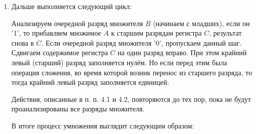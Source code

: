 \documentclass[12pt,a4paper]{scrartcl}
\begin{document}
\begin{enumerate}
	\item Дальше выполняется следующий цикл:
	
	\subitem Анализируем очередной разряд множителя $B$ (начинаем с младших), если он '1', то прибавляем множимое $A$ к старшим разрядам регистра $C$, результат снова в $C$. Если очередной разряд множителя '0', пропускаем данный шаг.
	\subitem Сдвигаем содержимое регистра $C$ на один разряд вправо. При этом крайний левый (старший) разряд заполняется нулём. Но если перед этим была операция сложения, во время которой возник перенос из старшего разряда, то тогда крайний левый разряд заполняется единицей.
	
	\subitem Действия, описанные в п. п. 4.1 и 4.2, повторяются до тех пор, пока не будут проанализированы все разряды множителя.
	
	В итоге процесс умножения выглядит следующим образом:
	

\end{enumerate}
\end{document}
